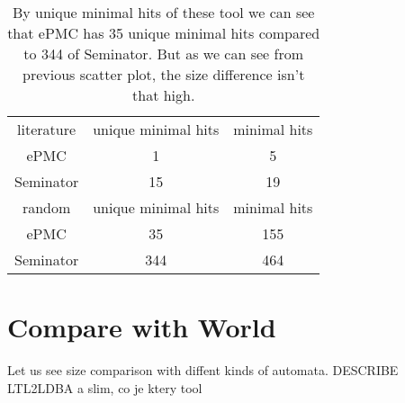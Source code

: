 \documentclass[
	digital
nolof, nolot
]{fithesis3}
\begin{document}
\begin{table}[ht]
	\centering
	\caption{By unique minimal hits of these tool we can see that ePMC has 35 unique minimal hits compared to 344 of Seminator. But as we can see from previous scatter plot, the size difference isn't that high.}
	\begin{tabular}{ |c||c|c| } 
		\hline
		literature&unique minimal hits&minimal hits\\
		\hhline{|===|}
		ePMC&1 & 5\\
		\hline
		Seminator &15 & 19\\ 
		\hline
		\hline
		random&unique minimal hits&minimal hits\\
		\hhline{|===|}
		ePMC&35 & 155\\
		\hline
		Seminator &344 & 464\\ 
		\hline
	\end{tabular}
\end{table}
		
	
	
	
		
		

	\clearpage
		\section{Compare with World}
		Let us see size comparison with diffent kinds of automata. DESCRIBE LTL2LDBA a slim, co je ktery tool
		
\end{document}
